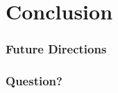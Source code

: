 \documentclass{beamer}
\begin{document}
\section{Conclusion}

\begin{frame}
\frametitle{Future Directions}
\begin{large}

\end{large}
\end{frame}

\begin{frame}
\frametitle{Question?}
\begin{large}

\end{large}
\end{frame}

\begin{frame}
\begin{tiny}
	\printbibliography[title={Whole bibliography}]

\end{tiny}
\end{frame}
\end{document}
